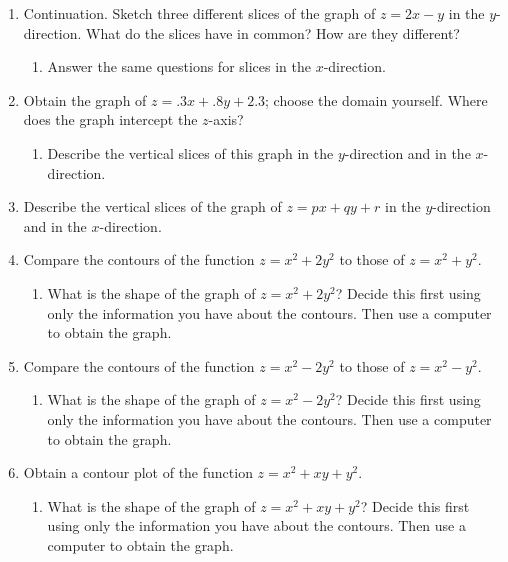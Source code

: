 \begin{enumerate}
\begin{enumerate}
\end{enumerate}
\item Continuation.  Sketch three different slices of the graph of $z
= 2x - y$ in the $y$-direction.  What do the slices have in common?
How are they different?

  \begin{enumerate}
  \item Answer the same questions for slices in the $x$-direction.


\end{enumerate}
\item Obtain the graph of $z = .3 x + .8 y + 2.3$; choose the domain
yourself.  Where does the graph intercept the $z$-axis?

  \begin{enumerate}
  \item Describe the vertical slices of this graph in the $y$-direction
and in the $x$-direction.


\end{enumerate}
\item Describe the vertical slices of the graph of $z = px + qy + r$ in
the $y$-direction and in the $x$-direction.


\item Compare the contours of the function $z = x^2 + 2 y^2$ to those
of $z = x^2 + y^2$.

  \begin{enumerate}
  \item What is the shape of the graph of $z = x^2 + 2 y^2$?  Decide this
first using only the information you have about the contours.  Then
use a computer to obtain the graph.


\end{enumerate}
\item Compare the contours of the function $z = x^2 - 2 y^2$ to those
of $z = x^2 - y^2$.

  \begin{enumerate}
  \item What is the shape of the graph of $z = x^2 - 2 y^2$?  Decide this
first using only the information you have about the contours.  Then
use a computer to obtain the graph.


\end{enumerate}
\item Obtain a contour plot of the function $z = x^2 + xy + y^2$.

  \begin{enumerate}
  \item What is the shape of the graph of $z = x^2 + xy + y^2$?  Decide
this first using only the information you have about the contours.
Then use a computer to obtain the graph.



\end{enumerate}
\end{enumerate}
